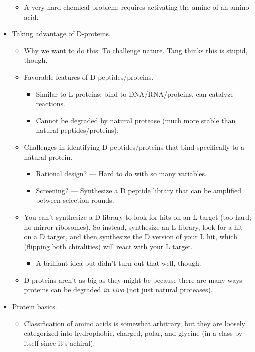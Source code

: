 \documentclass[../notes.tex]{subfiles}
\begin{document}
\begin{itemize}
    \begin{itemize}
        \item A very hard chemical problem; requires activating the amine of an amino acid.
    \end{itemize}
    \item Taking advantage of D-proteins.
    \begin{itemize}
        \item Why we want to do this: To challenge nature. Tang thinks this is stupid, though.
        \item Favorable features of D peptides/proteins.
        \begin{itemize}
            \item Similar to L proteins: bind to DNA/RNA/proteins, can catalyze reactions.
            \item Cannot be degraded by natural protease (much more stable than natural peptides/proteins).
        \end{itemize}
        \item Challenges in identifying D peptides/proteins that bind specifically to a natural protein.
        \begin{itemize}
            \item Rational design? --- Hard to do with so many variables.
            \item Screening? --- Synthesize a D peptide library that can be amplified between selection rounds.
        \end{itemize}
        \item You can't synthesize a D library to look for hits on an L target (too hard; no mirror ribosomes). So instead, synthesize an L library, look for a hit on a D target, and then synthesize the D version of your L hit, which (flipping both chiralities) will react with your L target.
        \begin{itemize}
            \item A brilliant idea but didn't turn out that well, though.
        \end{itemize}
        \item D-proteins aren't as big as they might be because there are many ways proteins can be degraded \emph{in vivo} (not just natural proteases).
    \end{itemize}
    \item Protein basics.
    \begin{itemize}
        \item Classification of amino acids is somewhat arbitrary, but they are loosely categorized into hydrophobic, charged, polar, and glycine (in a class by itself since it's achiral).

\end{itemize}
\end{itemize}
\end{document}
